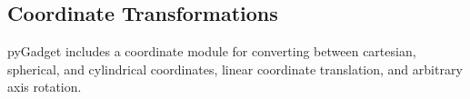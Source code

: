 \subsection{Coordinate Transformations}
\label{sec:coords}
pyGadget includes a coordinate module for converting between cartesian, spherical, and cylindrical coordinates, linear coordinate translation, and arbitrary axis rotation.